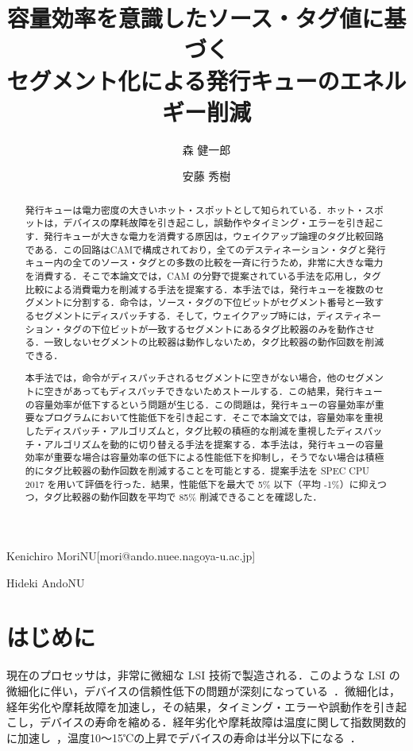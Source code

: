 \documentclass[submit,techrep,noauthor]{ipsj}
\begin{document}
\title{容量効率を意識したソース・タグ値に基づく\\セグメント化による発行キューのエネルギー削減}


\author{森 健一郎}{Kenichiro Mori}{NU}[mori@ando.nuee.nagoya-u.ac.jp]
\author{安藤 秀樹}{Hideki Ando}{NU}

\begin{abstract}
発行キューは電力密度の大きいホット・スポットとして知られている．ホット・スポットは，デバイスの摩耗故障を引き起こし，誤動作やタイミング・エラーを引き起こす．発行キューが大きな電力を消費する原因は，ウェイクアップ論理のタグ比較回路である．この回路はCAMで構成されており，全てのデスティネーション・タグと発行キュー内の全てのソース・タグとの多数の比較を一斉に行うため，非常に大きな電力を消費する．そこで本論文では，CAM の分野で提案されている手法を応用し，タグ比較による消費電力を削減する手法を提案する．本手法では，発行キューを複数のセグメントに分割する．命令は，ソース・タグの下位ビットがセグメント番号と一致するセグメントにディスパッチする．そして，ウェイクアップ時には，ディスティネーション・タグの下位ビットが一致するセグメントにあるタグ比較器のみを動作させる．一致しないセグメントの比較器は動作しないため，タグ比較器の動作回数を削減できる．

本手法では，命令がディスパッチされるセグメントに空きがない場合，他のセグメントに空きがあってもディスパッチできないためストールする．この結果，発行キューの容量効率が低下するという問題が生じる．この問題は，発行キューの容量効率が重要なプログラムにおいて性能低下を引き起こす．そこで本論文では，容量効率を重視したディスパッチ・アルゴリズムと，タグ比較の積極的な削減を重視したディスパッチ・アルゴリズムを動的に切り替える手法を提案する．本手法は，発行キューの容量効率が重要な場合は容量効率の低下による性能低下を抑制し，そうでない場合は積極的にタグ比較器の動作回数を削減することを可能とする．提案手法を SPEC CPU 2017 を用いて評価を行った．結果，性能低下を最大で 5\% 以下（平均 -1\%）に抑えつつ，タグ比較器の動作回数を平均で 85\% 削減できることを確認した．
\end{abstract}

\maketitle

\section{はじめに}
現在のプロセッサは，非常に微細な LSI 技術で製造される．このような LSI の微細化に伴い，デバイスの信頼性低下の問題が深刻になっている~\cite{Weste2010}．微細化は，経年劣化や摩耗故障を加速し，その結果，タイミング・エラーや誤動作を引き起こし，デバイスの寿命を縮める．経年劣化や摩耗故障は温度に関して指数関数的に加速し~\cite{Monsieur2001,Khan2010,Black1969}，温度10〜15℃の上昇でデバイスの寿命は半分以下になる~\cite{Viswanath2000}．
\end{document}
